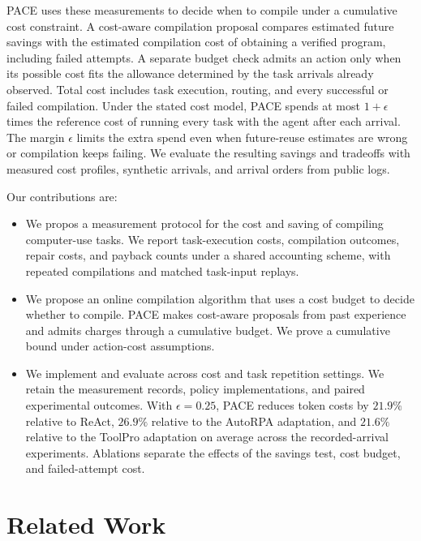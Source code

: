 PACE uses these measurements to decide when to compile under a cumulative cost constraint.
A cost-aware compilation proposal compares estimated future savings with the estimated compilation cost of obtaining a verified program, including failed attempts.
A separate budget check admits an action only when its possible cost fits the allowance determined by the task arrivals already observed.
Total cost includes task execution, routing, and every successful or failed compilation.
Under the stated cost model, PACE spends at most $1+\epsilon$ times the reference cost of running every task with the agent after each arrival.
The margin $\epsilon$ limits the extra spend even when future-reuse estimates are wrong or compilation keeps failing.
We evaluate the resulting savings and tradeoffs with measured cost profiles, synthetic arrivals, and arrival orders from public logs.

Our contributions are:
\begin{itemize}
\item We propos a measurement protocol for the cost and saving of compiling computer-use tasks.
We report task-execution costs, compilation outcomes, repair costs, and payback counts under a shared accounting scheme, with repeated compilations and matched task-input replays.
\item We propose an online compilation algorithm that uses a cost budget to decide whether to compile.
PACE makes cost-aware proposals from past experience and admits charges through a cumulative budget.
We prove a cumulative bound under action-cost assumptions.
\item We implement and evaluate across cost and task repetition settings.
We retain the measurement records, policy implementations, and paired experimental outcomes.
With $\epsilon=0.25$, PACE reduces token costs by $21.9\%$ relative to ReAct, $26.9\%$ relative to the AutoRPA adaptation, and $21.6\%$ relative to the ToolPro adaptation on average across the recorded-arrival experiments.
Ablations separate the effects of the savings test, cost budget, and failed-attempt cost.
\end{itemize}






\section{Related Work}
\label{sec:related}

